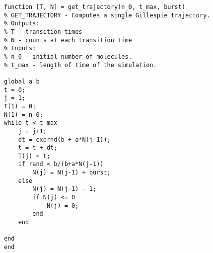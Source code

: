 
    \begin{verbatim}
function [T, N] = get_trajectory(n_0, t_max, burst)
% GET_TRAJECTORY - Computes a single Gillespie trajectory.
% Outputs:
% T - transition times
% N - counts at each transition time
% Inputs:
% n_0 - initial number of molecules.
% t_max - length of time of the simulation.

global a b
t = 0;
j = 1;
T(1) = 0;
N(1) = n_0;
while t < t_max
    j = j+1;
    dt = exprnd(b + a*N(j-1));
    t = t + dt;
    T(j) = t;
    if rand < b/(b+a*N(j-1))
        N(j) = N(j-1) + burst;
    else
        N(j) = N(j-1) - 1;
        if N(j) <= 0
            N(j) = 0;
        end
    end

end
end
\end{verbatim}
